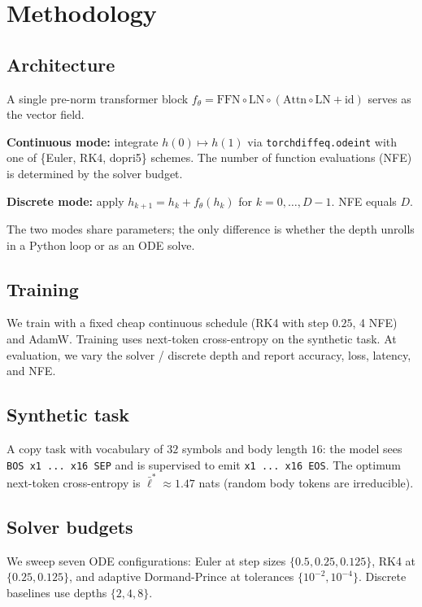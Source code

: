 \section{Methodology}
\subsection{Architecture}
A single pre-norm transformer block
\(f_\theta = \text{FFN}\circ\text{LN}\circ(\text{Attn}\circ\text{LN}+\mathrm{id})\)
serves as the vector field.

\textbf{Continuous mode:} integrate
$h(0) \mapsto h(1)$ via \texttt{torchdiffeq.odeint} with one of
\{Euler, RK4, dopri5\} schemes. The number of function evaluations
(NFE) is determined by the solver budget.

\textbf{Discrete mode:} apply
$h_{k+1} = h_k + f_\theta(h_k)$ for $k=0,\dots,D-1$. NFE equals $D$.

The two modes share parameters; the only difference is whether the depth
unrolls in a Python loop or as an ODE solve.

\subsection{Training}
We train with a fixed cheap continuous schedule (RK4 with step
$0.25$, 4 NFE) and AdamW. Training uses next-token cross-entropy on the
synthetic task. At evaluation, we vary the solver / discrete depth and
report accuracy, loss, latency, and NFE.

\subsection{Synthetic task}
A copy task with vocabulary of $32$ symbols and body length $16$:
the model sees \texttt{BOS x1 ... x16 SEP} and is supervised to emit
\texttt{x1 ... x16 EOS}. The optimum next-token cross-entropy is
\(\bar{\ell}^*\approx 1.47\) nats (random body tokens are irreducible).

\subsection{Solver budgets}
We sweep seven ODE configurations: Euler at step sizes $\{0.5, 0.25, 0.125\}$,
RK4 at $\{0.25, 0.125\}$, and adaptive Dormand-Prince at
tolerances $\{10^{-2}, 10^{-4}\}$. Discrete baselines use depths $\{2, 4, 8\}$.
